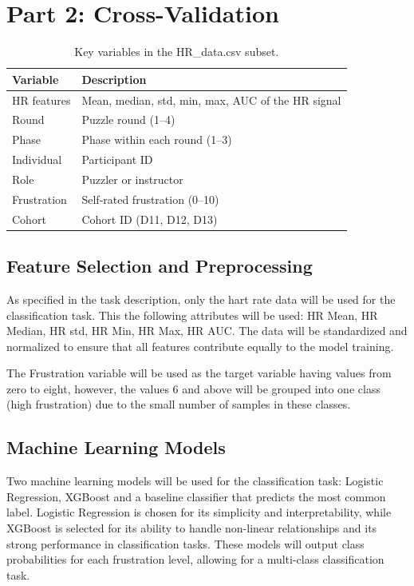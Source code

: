 \section{Part 2: Cross-Validation}
	\begin{table}[ht]
		\centering
		\begin{tabular}{@{}ll@{}}
			\toprule
			\textbf{Variable}       & \textbf{Description}                        \\
			\midrule
			HR features             & Mean, median, std, min, max, AUC of the HR signal  \\
			Round                   & Puzzle round (1–4)                          \\
			Phase                   & Phase within each round (1–3)               \\
			Individual               & Participant ID                              \\
			Role                    & Puzzler or instructor                       \\
			Frustration             & Self‐rated frustration (0–10)               \\
			Cohort                  & Cohort ID (D11, D12, D13)                   \\
			\bottomrule
		\end{tabular}
		\caption{Key variables in the HR\_data.csv subset.}
		\label{tab:dataset_variables}
	\end{table}

	\subsection{Feature Selection and Preprocessing}
	As specified in the task description, only the hart rate data will be used for the classification task.
	This the following attributes will be used: HR Mean, HR Median, HR std, HR Min, HR Max, HR AUC\@.
	The data will be standardized and normalized to ensure that all features contribute equally to the model training.

	The Frustration variable will be used as the target variable having values from zero to eight, however, the values
		6 and above will be grouped into one class (high frustration) due to the small number of samples in these
		classes.

	\subsection{Machine Learning Models}
	Two machine learning models will be used for the classification task:
		Logistic Regression, XGBoost and a baseline classifier that predicts the most common label.
	Logistic Regression is chosen for its simplicity and interpretability, while XGBoost is selected for its
		ability to handle non-linear relationships and its strong performance in classification tasks.
	These models will output class probabilities for each frustration level, allowing for a multi-class classification
		task.

